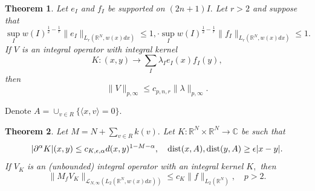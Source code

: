 \documentclass{amsart}
\newtheorem{thm}{Theorem}
\begin{document}
\begin{thm}\label{rochberg-semmes theorem} Let $e_I$ and $f_I$ be supported on $(2n+1)I.$ Let $r>2$ and suppose that
$$\sup_Iw(I)^{\frac12-\frac1r}\|e_I\|_{L_r(\mathbb{R}^N,w(x)dx)}\leq 1,\cdot \sup_Iw(I)^{\frac12-\frac1r}\|f_I\|_{L_r(\mathbb{R}^N,w(x)dx)}\leq 1.$$
If $V$ is an integral operator with integral kernel
$$K:(x,y)\to\sum_I\lambda_Ie_I(x)f_I(y),$$
then
$$\|V\|_{p,\infty}\leq c_{p,n,r}\|\lambda\|_{p,\infty}.$$
\end{thm}

Denote $A=\cup_{v\in R}\{\langle x,v\rangle=0\}.$

\begin{thm} Let $M=N+\sum_{v\in R}k(v).$ Let  $K:\mathbb{R}^N\times\mathbb{R}^N\to\mathbb{C}$ be such that
$$|\partial^{\alpha}K|(x,y)\leq c_{K,\epsilon,\alpha}d(x,y)^{1-M-\alpha},\quad {\rm dist}(x,A),{\rm dist}(y,A)\geq\epsilon|x-y|.$$
If $V_K$ is an (unbounded) integral operator with an integral kernel $K,$ then
$$\|M_fV_K\|_{\mathcal{L}_{N,\infty}(L_2(\mathbb{R}^N,w(x)dx))}\leq c_K\|f\|_{L_2(\mathbb{R}^N)},\quad p>2.$$ 
\end{thm}
\end{document}

